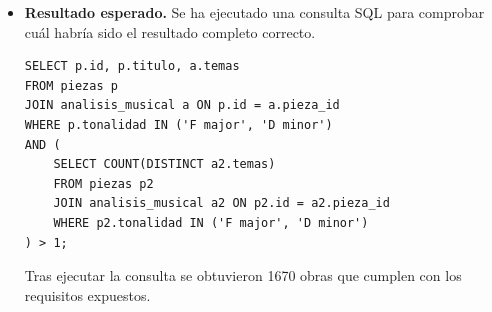 \begin{itemize}
*   **ID 65** (Tonalidad: F major): Temas de nana, infantil.
*   **ID 71** (Tonalidad: F major): Temas de naturaleza, infantil.
*   **ID 72** (Tonalidad: F major): Temas de naturaleza, infantil, picaresca.
*   **ID 74** (Tonalidad: F major): Temas de infantil, música.
*   **ID 78** (Tonalidad: F major): Temas de infantil, religión, amor.
*   **ID 79** (Tonalidad: F major): Temas de naturaleza, infantil.
*   **ID 86** (Tonalidad: F major): Temas de guerra, militar.
*   **ID 92** (Tonalidad: F major): Temas de picaresca, infantil.
*   **ID 96** (Tonalidad: F major): Temas de naturaleza, picaresca, infantil.
*   **ID 97** (Tonalidad: F major): Temas de guerra, militar."
\item \textbf{Resultado esperado.} Se ha ejecutado una consulta SQL para comprobar cuál habría sido el resultado completo correcto.
    \begin{verbatim}
SELECT p.id, p.titulo, a.temas
FROM piezas p
JOIN analisis_musical a ON p.id = a.pieza_id
WHERE p.tonalidad IN ('F major', 'D minor')
AND (
    SELECT COUNT(DISTINCT a2.temas)
    FROM piezas p2
    JOIN analisis_musical a2 ON p2.id = a2.pieza_id
    WHERE p2.tonalidad IN ('F major', 'D minor')
) > 1;
    \end{verbatim}    
    Tras ejecutar la consulta se obtuvieron 1670 obras que cumplen con los requisitos expuestos.

\end{itemize}

